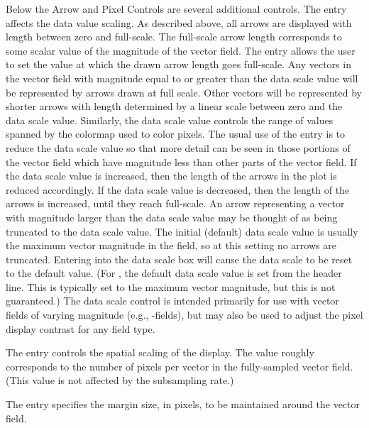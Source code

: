 Below the Arrow and Pixel Controls are several additional controls.  The
\label{html:mmdispdatascale} entry
affects the data value scaling.  As described above, all arrows are
displayed with length between zero and full-scale.  The full-scale arrow
length corresponds to some scalar value of the magnitude of the vector
field.  The  entry allows the user to
set the value at which the drawn arrow length goes full-scale.  Any
vectors in the vector field with magnitude equal to or greater than the
data scale value will be represented by arrows drawn at full scale.
Other vectors will be represented by shorter arrows with length
determined by a linear scale between zero and the data scale value.
Similarly, the data scale value controls the range of values spanned by
the colormap used to color pixels.  The usual use of the
 entry is to reduce the data
scale value so that more detail can be seen in those portions of
the vector field which have magnitude less than other parts of the
vector field.
If the data scale value is increased, then the length of the
arrows in the plot is reduced accordingly.  If the data scale value is
decreased, then the length of the arrows is increased, until they
reach full-scale.
An arrow representing a vector with magnitude larger than the
data scale value may be thought of as being truncated to the data scale
value.  The initial (default) data scale value is usually the maximum
vector magnitude in the field, so at this setting no arrows are
truncated.  Entering  into the data scale box will cause the data
scale to be reset to the default value.  (For ,
the default data scale value is set from the \cd{ValueRangeMaxMag}
header line.  This is typically set to the maximum vector magnitude, but
this is not guaranteed.)  The data scale control is intended primarily
for use with vector fields of varying magnitude (e.g., \vH -fields), but
may also be used to adjust the pixel display contrast for any field
type.

The  entry controls the spatial scaling of
the display.  The value roughly corresponds to the number of pixels per
vector in the fully-sampled vector field.  (This value is not affected
by the subsampling rate.)

The  entry specifies the margin size, in pixels, to be
maintained around the vector field.

